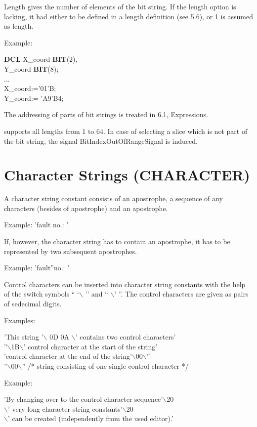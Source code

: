 Length gives the number of elements of the bit string. If the length
option is lacking, it had either to be defined in a length
definition (see 5.6), or 1 is assumed as length.

Example:

{\bf DCL} X\_coord {\bf BIT}(2),\\
\x Y\_coord {\bf BIT}(8);\\
...\\
X\_coord:='01'B;\\
Y\_coord:= 'A9'B4;

The addressing of parts of bit strings is treated in 6.1, Expressions.

\begin{added}
\OpenPEARL{} supports all lengths from 1 to 64.
In case of selecting a slice which is not part of the bit string, the
signal BitIndexOutOfRangeSignal is induced.
\end{added}

\section{Character Strings (CHARACTER)}  %

A character string constant consists of an apostrophe, a sequence of any
characters (besides of apostrophe) and an apostrophe.

Example: 'fault no.: '

If, however, the character string has to contain an apostrophe, it has
to be represented by two subsequent apostrophes.

Example: 'fault''no.: '

Control characters can be inserted into character string constants with
the help of the switch symbols `` `$\backslash$ '' and `` $\backslash$'
''.  The control characters are given as pairs of sedecimal digits.

Examples:

'This string '$\backslash$ 0D 0A $\backslash$' contains two control characters'\\
''$\backslash$1B$\backslash$' control character at the start of the string'\\
'control character at the end of the string'$\backslash$00$\backslash$''\\
''$\backslash$00$\backslash$'' /* string consisting of one single control character */

Example:

'By changing over to the control character sequence'$\backslash$20\\
$\backslash$' very long character string constants'$\backslash$20\\
$\backslash$' can be created (independently from the used editor).'

